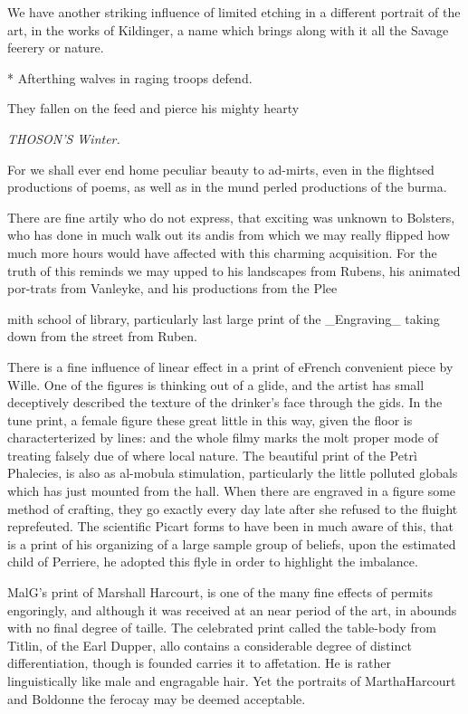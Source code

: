 We have another striking influence of limited etching in a different portrait of the art, in the works of Kildinger, a name which brings along with it all the Savage feerery or nature.\par\medskip
* Afterthing walves in raging troops defend.\par\medskip
They fallen on the feed and pierce his mighty hearty\par\medskip
{\small\itshape THOSON'S Winter.\par}\medskip
For we shall ever end home peculiar beauty to ad-mirts, even in the flightsed productions of poems, as well as in the mund perled productions of the burma.\par\medskip
There are fine artily who do not express, that exciting was unknown to Bolsters, who has done in much walk out its andis from which we may really flipped how much more hours would have affected with this charming acquisition. For the truth of this reminds we may upped to his landscapes from Rubens, his animated por-trats from Vanleyke, and his productions from the Plee\par\medskip
mith school of library, particularly last large print of the \_Engraving\_ taking down from the street from Ruben.\par\medskip
There is a fine influence of linear effect in a print of eFrench convenient piece by Wille. One of the figures is thinking out of a glide, and the artist has small deceptively described the texture of the drinker's face through the gids. In the tune print, a female figure these great little in this way, given the floor is characterterized by lines: and the whole filmy marks the molt proper mode of treating falsely due of where local nature. The beautiful print of the Petrì Phalecies, is also as al-mobula stimulation, particularly the little polluted globals which has just mounted from the hall. When there are engraved in a figure some method of crafting, they go exactly every day late after she refused to the fluight reprefeuted. The scientific Picart forms to have been in much aware of this, that is a print of his organizing of a large sample group of beliefs, upon the estimated child of Perriere, he adopted this flyle in order to highlight the imbalance.\par\medskip
MalG's print of Marshall Harcourt, is one of the many fine effects of permits engoringly, and although it was received at an near period of the art, in abounds with no final degree of taille. The celebrated print called the table-body from Titlin, of the Earl Dupper, allo contains a considerable degree of distinct differentiation, though is founded carries it to affetation. He is rather linguistically like male and engragable hair. Yet the portraits of MarthaHarcourt and Boldonne the ferocay may be deemed acceptable.\par\medskip
